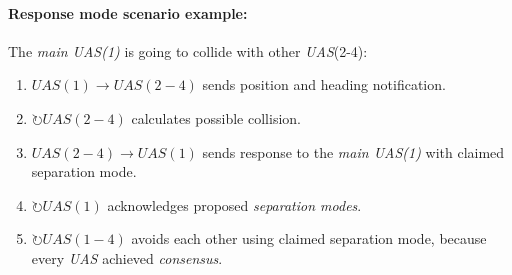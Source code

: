 \paragraph{Response mode scenario example:} The \emph{main UAS(1)} is going to collide with other \emph{UAS}(2-4):
\begin{enumerate}
    \item $UAS(1) \to UAS(2-4)$ sends position and heading notification.
    \item $\circlearrowright UAS(2-4)$ calculates possible collision.
    \item $UAS(2-4) \to UAS(1)$ sends response to the \emph{main UAS(1)} with claimed separation mode. 
    \item $\circlearrowright UAS(1)$ acknowledges proposed \emph{separation modes}.
    \item $\circlearrowright UAS(1-4)$ avoids each other using claimed separation mode, because every \emph{UAS} achieved \emph{consensus}.
\end{enumerate}